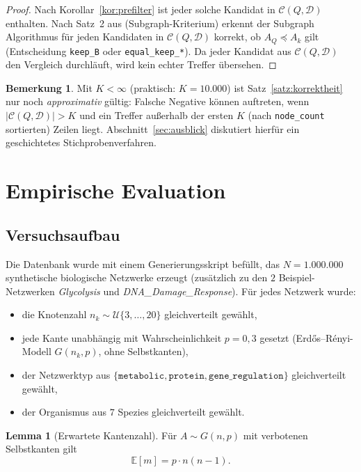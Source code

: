 \documentclass[a4paper,12pt]{article}
\theoremstyle{definition}
\newtheorem{lemma}{Lemma}
\newtheorem{bemerkung}{Bemerkung}
\begin{document}
\begin{proof}
	Nach Korollar~\ref{kor:prefilter} ist jeder solche Kandidat in $\mathcal{C}(Q,\mathcal{D})$ enthalten. Nach Satz~2 aus \cite{epp2026subgraph} (Subgraph-Kriterium) erkennt der Subgraph Algorithmus für jeden Kandidaten in $\mathcal{C}(Q,\mathcal{D})$ korrekt, ob $A_Q \preceq A_k$ gilt (Entscheidung \texttt{keep\_B} oder \texttt{equal\_keep\_*}). Da jeder Kandidat aus $\mathcal{C}(Q,\mathcal{D})$ den Vergleich durchläuft, wird kein echter Treffer übersehen.
\end{proof}

\begin{bemerkung}
	Mit $K < \infty$ (praktisch: $K = 10.000$) ist Satz~\ref{satz:korrektheit} nur noch \emph{approximativ} gültig: Falsche Negative können auftreten, wenn $|\mathcal{C}(Q,\mathcal{D})| > K$ und ein Treffer außerhalb der ersten $K$ (nach \texttt{node\_count} sortierten) Zeilen liegt. Abschnitt~\ref{sec:ausblick} diskutiert hierfür ein geschichtetes Stichprobenverfahren.
\end{bemerkung}

\section{Empirische Evaluation}
\label{sec:evaluation}

\subsection{Versuchsaufbau}

Die Datenbank wurde mit einem Generierungsskript befüllt, das $N = 1.000.000$ synthetische biologische Netzwerke erzeugt (zusätzlich zu den $2$ Beispiel-Netzwerken \emph{Glycolysis} und \emph{DNA\_Damage\_Response}). Für jedes Netzwerk wurde:
\begin{itemize}
	\item die Knotenzahl $n_k \sim \mathcal{U}\{3,\ldots,20\}$ gleichverteilt gewählt,
	\item jede Kante unabhängig mit Wahrscheinlichkeit $p = 0{,}3$ gesetzt (Erdős–Rényi-Modell $G(n_k,p)$, ohne Selbstkanten),
	\item der Netzwerktyp aus $\{\texttt{metabolic}, \texttt{protein}, \texttt{gene\_regulation}\}$ gleichverteilt gewählt,
	\item der Organismus aus $7$ Spezies gleichverteilt gewählt.
\end{itemize}

\begin{lemma}[Erwartete Kantenzahl]
	Für $A \sim G(n,p)$ mit verbotenen Selbstkanten gilt
	\[
	\mathbb{E}[m] = p \cdot n(n-1).
	\]
\end{lemma}
\end{document}
